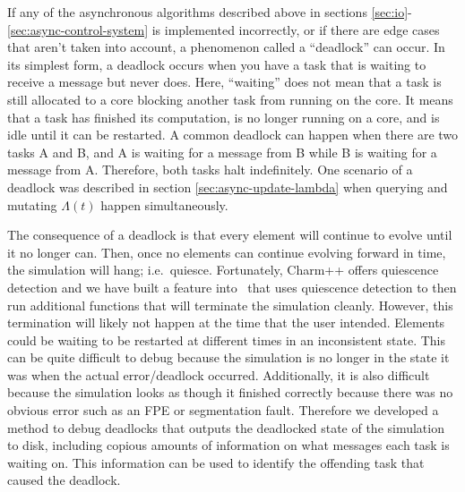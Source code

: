 \begin{bibunit}[unsrtnat]
If any of the asynchronous algorithms described above in sections
\ref{sec:io}-\ref{sec:async-control-system} is implemented incorrectly, or if
there are edge cases that aren't taken into account, a phenomenon called a
``deadlock'' can occur. In its simplest form, a deadlock occurs when you have a
task that is waiting to receive a message but never does. Here, ``waiting'' does
not mean that a task is still allocated to a core blocking another task from
running on the core. It means that a task has finished its computation, is no
longer running on a core, and is idle until it can be restarted. A common
deadlock can happen when there are two tasks A and B, and A is waiting for a
message from B while B is waiting for a message from A. Therefore, both tasks
halt indefinitely. One scenario of a deadlock was described in section
\ref{sec:async-update-lambda} when querying and mutating $\Lambda(t)$ happen
simultaneously.

The consequence of a deadlock is that every element will continue to evolve
until it no longer can. Then, once no elements can continue evolving forward in
time, the simulation will hang; i.e.~quiesce. Fortunately, Charm++ offers
quiescence detection and we have built a feature into \spectre~that uses
quiescence detection to then run additional functions that will terminate the
simulation cleanly. However, this termination will likely not happen at the time
that the user intended. Elements could be waiting to be restarted at different
times in an inconsistent state. This can be quite difficult to debug because the
simulation is no longer in the state it was when the actual error/deadlock
occurred. Additionally, it is also difficult because the simulation looks as
though it finished correctly because there was no obvious error such as an FPE
or segmentation fault. Therefore we developed a method to debug deadlocks that
outputs the deadlocked state of the simulation to disk, including copious
amounts of information on what messages each task is waiting on. This
information can be used to identify the offending task that caused the
deadlock.
  

\end{bibunit}
